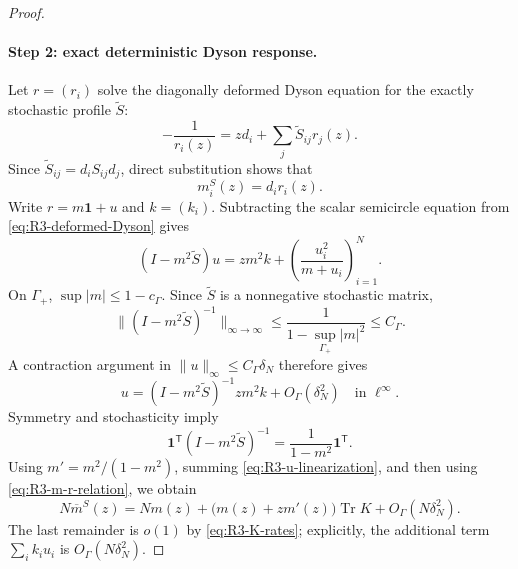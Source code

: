\documentclass[11pt]{article}
\theoremstyle{definition}
\theoremstyle{remark}
\newcommand{\Tr}{\operatorname{Tr}}
\newcommand{\one}{\mathbf 1}
\newcommand{\norm}[1]{\lVert #1\rVert}
\begin{document}
\begin{proof}
\paragraph{Step 2: exact deterministic Dyson response.}
Let \(r=(r_i)\) solve the diagonally deformed Dyson equation for the exactly
stochastic profile \(\widetilde S\):
\begin{equation}\label{eq:R3-deformed-Dyson}
 -\frac1{r_i(z)}=zd_i+\sum_j\widetilde S_{ij}r_j(z).
\end{equation}
Since \(\widetilde S_{ij}=d_iS_{ij}d_j\), direct substitution shows that
\begin{equation}\label{eq:R3-m-r-relation}
 m_i^S(z)=d_i r_i(z).
\end{equation}
Write \(r=m\one+u\) and \(k=(k_i)\).  Subtracting the scalar semicircle
equation from \eqref{eq:R3-deformed-Dyson} gives
\begin{equation}\label{eq:R3-u-equation}
 (I-m^2\widetilde S)u
 =zm^2k+\left(\frac{u_i^2}{m+u_i}\right)_{i=1}^N.
\end{equation}
On \(\Gamma_+\), \(\sup|m|\le1-c_\Gamma\).  Since \(\widetilde S\) is a
nonnegative stochastic matrix,
\begin{equation}\label{eq:R3-scalar-stability}
 \norm{(I-m^2\widetilde S)^{-1}}_{\infty\to\infty}
 \le\frac1{1-\sup_{\Gamma_+}|m|^2}\le C_\Gamma.
\end{equation}
A contraction argument in \(\norm{u}_\infty\le C_\Gamma\delta_N\) therefore
gives
\begin{equation}\label{eq:R3-u-linearization}
 u=(I-m^2\widetilde S)^{-1}zm^2k+O_\Gamma(\delta_N^2)
 \quad\text{in }\ell^\infty.
\end{equation}
Symmetry and stochasticity imply
\[
 \one^{\mathsf T}(I-m^2\widetilde S)^{-1}
 =\frac1{1-m^2}\one^{\mathsf T}.
\]
Using \(m'=m^2/(1-m^2)\), summing
\eqref{eq:R3-u-linearization}, and then using
\eqref{eq:R3-m-r-relation}, we obtain
\begin{equation}\label{eq:R3-deterministic-congruence-expansion}
 N\overline m^S(z)
 =Nm(z)+\bigl(m(z)+zm'(z)\bigr)\Tr K
 +O_\Gamma(N\delta_N^2).
\end{equation}
The last remainder is \(o(1)\) by \eqref{eq:R3-K-rates}; explicitly,
the additional term \(\sum_i k_iu_i\) is
\(O_\Gamma(N\delta_N^2)\).


\end{proof}
\end{document}
